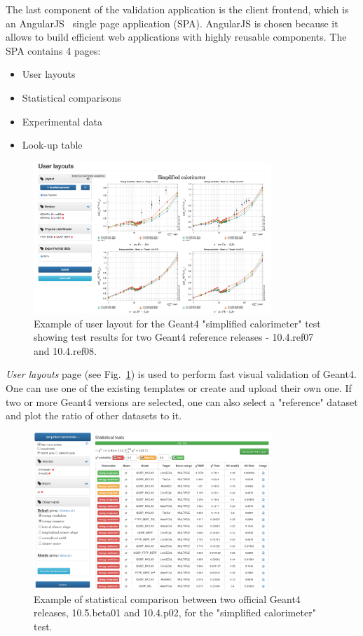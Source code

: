 The last component of the validation application is the client frontend, which is an AngularJS~\cite{AngularJS} single page application (SPA).
AngularJS is chosen because it allows to build efficient web applications with highly reusable components.
The SPA contains 4 pages:
\begin{itemize}
    \item User layouts
    \item Statistical comparisons
    \item Experimental data
    \item Look-up table
\end{itemize}

\begin{figure}[h]
    \centering
    \includegraphics[width=0.8\textwidth,clip]{layout_sc.png}
    \caption{Example of user layout for the Geant4 "simplified calorimeter" test showing test results for two Geant4 reference releases - 10.4.ref07 and 10.4.ref08.}
    \label{fig:layouts}
\end{figure}

\textit{User layouts} page (see Fig.~\ref{fig:layouts}) is used to perform fast visual validation of Geant4.  One can use one of the existing templates or create and upload their own one. %
If two or more Geant4 versions are selected, one can also select a "reference" dataset and plot the ratio of other datasets to it.

\begin{figure}[h]
    \centering
    \includegraphics[width=0.8\textwidth,clip]{statcomparison.png}
    \caption{Example of statistical comparison between two official Geant4 releases, 10.5.beta01 and 10.4.p02, for the "simplified calorimeter" test.}
    \label{fig:statcomparison}
\end{figure}


